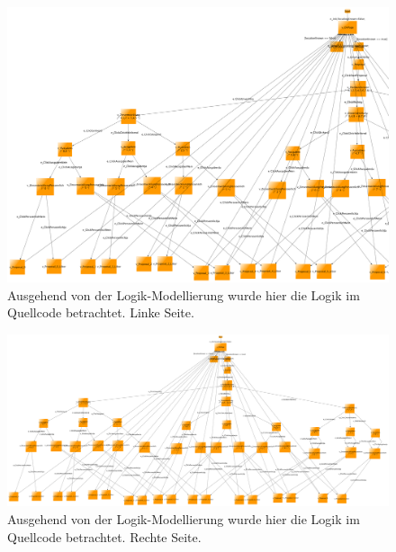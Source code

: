 \begin{figure}[p] \begin{leftfullpage}
\hspace*{-2.5cm}
\includegraphics[width=1.3\textwidth]{figures/modell_logisch_left.png}
\caption{Ausgehend von der Logik-Modellierung wurde hier die Logik im Quellcode betrachtet. Linke Seite.}
\label{fig:modell_logisch}
\end{leftfullpage} 
\end{figure} 
\begin{figure}[p] 
\begin{fullpage}
\hspace*{-2cm}
\includegraphics[width=1.2\textwidth]{figures/modell_logisch_right.png}
\caption{Ausgehend von der Logik-Modellierung wurde hier die Logik im Quellcode betrachtet. Rechte Seite.}
\end{fullpage} \end{figure} 

